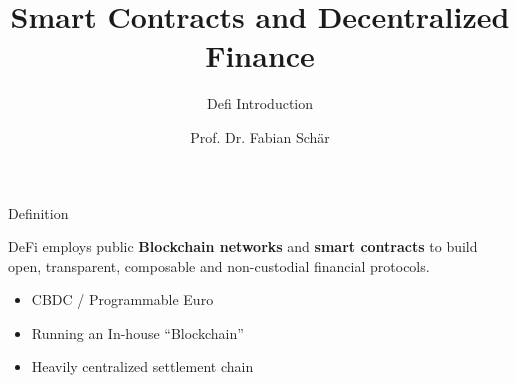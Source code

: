 \documentclass[]{beamer}
\title{Smart Contracts and Decentralized Finance}
\subtitle{Defi Introduction}
\author{Prof. Dr. Fabian Schär}
\institute{University of Basel}
\begin{document}
\thispagestyle{empty}
\begin{frame}[noframenumbering]
	\titlepage
\end{frame}

\begin{frame}{Definition}

DeFi employs public \textbf{Blockchain networks} and \textbf{smart contracts} to build open, transparent, composable and non-custodial financial protocols. \\ \vspace{3em}

	\vspace{1em}
	\begin{itemize}
		\item<3-> CBDC / Programmable Euro
		\item<4-> Running an In-house “Blockchain”
		\item<5-> Heavily centralized settlement chain
	\end{itemize}
	
\end{frame}
\end{document}
